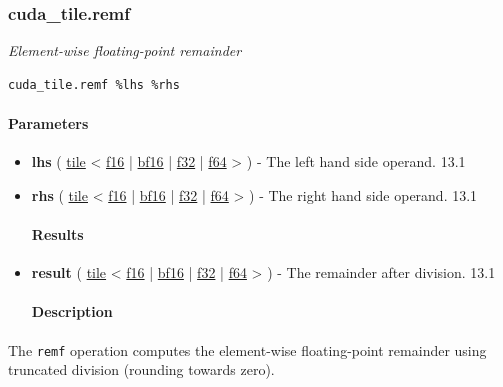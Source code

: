 \documentclass{article}
\begin{document}
\subsubsection{cuda\_tile.remf}

\textit{Element-wise floating-point remainder}


\begin{lstlisting}
cuda_tile.remf %lhs %rhs
\end{lstlisting}

\paragraph{Parameters}

\begin{itemize}
\item \textbf{lhs} ( \href{https://docs.nvidia.com/cuda/tile-ir/latest/sections/types.html#type-tile}{tile} < \href{https://docs.nvidia.com/cuda/tile-ir/latest/sections/types.html#subsection-element-types}{f16} | \href{https://docs.nvidia.com/cuda/tile-ir/latest/sections/types.html#subsection-element-types}{bf16} | \href{https://docs.nvidia.com/cuda/tile-ir/latest/sections/types.html#subsection-element-types}{f32} | \href{https://docs.nvidia.com/cuda/tile-ir/latest/sections/types.html#subsection-element-types}{f64} > ) - The left hand side operand. 13.1
\item \textbf{rhs} ( \href{https://docs.nvidia.com/cuda/tile-ir/latest/sections/types.html#type-tile}{tile} < \href{https://docs.nvidia.com/cuda/tile-ir/latest/sections/types.html#subsection-element-types}{f16} | \href{https://docs.nvidia.com/cuda/tile-ir/latest/sections/types.html#subsection-element-types}{bf16} | \href{https://docs.nvidia.com/cuda/tile-ir/latest/sections/types.html#subsection-element-types}{f32} | \href{https://docs.nvidia.com/cuda/tile-ir/latest/sections/types.html#subsection-element-types}{f64} > ) - The right hand side operand. 13.1


\paragraph{Results}

\item \textbf{result} ( \href{https://docs.nvidia.com/cuda/tile-ir/latest/sections/types.html#type-tile}{tile} < \href{https://docs.nvidia.com/cuda/tile-ir/latest/sections/types.html#subsection-element-types}{f16} | \href{https://docs.nvidia.com/cuda/tile-ir/latest/sections/types.html#subsection-element-types}{bf16} | \href{https://docs.nvidia.com/cuda/tile-ir/latest/sections/types.html#subsection-element-types}{f32} | \href{https://docs.nvidia.com/cuda/tile-ir/latest/sections/types.html#subsection-element-types}{f64} > ) - The remainder after division. 13.1


\paragraph{Description}

\end{itemize}
The \texttt{remf} operation computes the element-wise floating-point remainder using truncated division (rounding towards zero).
\end{document}
